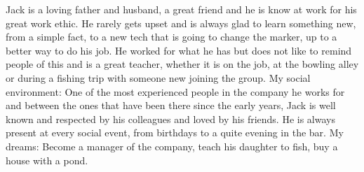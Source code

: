 Jack is a loving father and husband, a great friend and he is know at work for his great work ethic. He rarely gets upset and is always glad to learn something new, from a simple fact, to a new tech that is going to change the marker, up to a better way to do his job. He worked for what he has but does not like to remind people of this and is a great teacher, whether it is on the job, at the bowling alley or during a fishing trip with someone new joining the group. \newline
My social environment: \newline
One of the most experienced people in the company he works for and between the ones that have been there since the early years, Jack is well known and respected by his colleagues and loved by his friends. He is always present at every social event, from birthdays to a quite evening in the bar. \newline
My dreams: \newline
Become a manager of the company, teach his daughter to fish, buy a house with a pond.